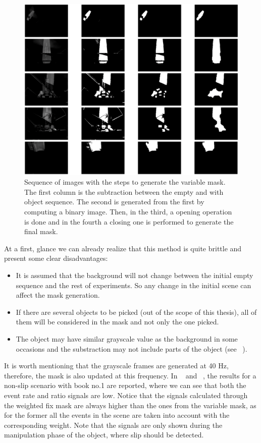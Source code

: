 \begin{figure}[H]
    \centering
    \includegraphics[width=\textwidth]{resources/images/var_mask_hb1}
    \caption{Sequence of images with the steps to generate the variable mask. The first column is the subtraction between the empty and with object sequence. The second is generated from the first by computing a binary image. Then, in the third, a opening operation is done and in the fourth a closing one is performed to generate the final mask.}\label{fig:var_mask_hb1}
\end{figure}

At a first, glance we can already realize that this method is quite brittle and present some clear disadvantages:

\begin{itemize}
	\item It is assumed that the background will not change between the initial empty sequence and the rest of experiments. So any change in the initial scene can affect the mask generation.
	\item If there are several objects to be picked (out of the scope of this thesis), all of them will be considered in the mask and not only the one picked.
	\item The object may have similar grayscale value as the background in some occasions and the substraction may not include parts of the object (see  ~).
\end{itemize}

It is worth mentioning that the grayscale frames are generated at 40 Hz, therefore, the mask is also updated at this frequency. In ~ and ~, the results for a non-slip scenario with book no.1 are reported, where we can see that both the event rate and ratio signals are low. Notice that the signals calculated through the weighted fix mask are always higher than the ones from the variable mask, as for the former all the events in the scene are taken into account with the corresponding weight. Note that the signals are only shown during the manipulation phase of the object, where slip should be detected.\\

